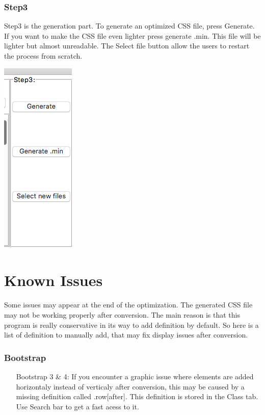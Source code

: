 \documentclass[10pt,letterpaper]{article}
\begin{document}
\section {Step3}
Step3 is the generation part. To generate an optimized CSS file, press Generate. If you want to make the CSS file even lighter press generate .min. This file will be lighter but almost unreadable. The Select file button allow the users to restart the process from scratch.
\begin{center} 
\includegraphics[scale=0.35]{step3}
\end{center}
\part {Known Issues}
\setcounter{section}{0}
Some issues may appear at the end of the optimization. The generated CSS file may not be working properly after conversion. The main reason is that this program is really conservative in its way to add definition by default. So here is a list of definition to manually add, that may fix display issues after conversion.
\section {Bootstrap}
\begin{itemize}
\item [Bootstrap 3 \& 4:] If you encounter a graphic issue where elements are added horizontaly instead of verticaly after conversion, this may be caused by a missing definition called .row[after]. This definition is stored in the Class tab. Use Search bar to get a fast acess to it.
\end{itemize}
\end{document}

